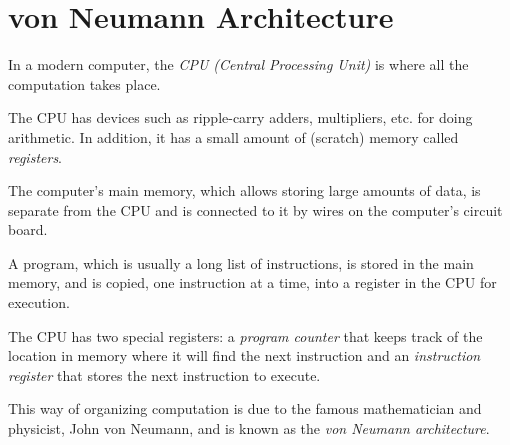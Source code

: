 \documentclass[8pt,a4paper,compress,handout]{beamer}
\begin{document}
\section{von Neumann Architecture}
\begin{frame}[fragile]
In a modern computer, the \emph{CPU (Central Processing Unit)} is where all the computation takes place.

\bigskip

The CPU has devices such as ripple-carry adders, multipliers, etc. for doing arithmetic. In addition, it has a small amount of (scratch) memory called \emph{registers}.

\bigskip

The computer's main memory, which allows storing large amounts of data, is separate from the CPU and is connected to it by wires on the computer's circuit board.

\bigskip

A program, which is usually a long list of instructions, is stored in the main memory, and is copied, one instruction at a time, into a register in the CPU for execution.

\bigskip

The CPU has two special registers: a \emph{program counter} that keeps track of the location in memory where it will find the next instruction and an \emph{instruction register} that stores the next instruction to execute. 

\bigskip

This way of organizing computation is due to the famous mathematician and physicist, John von Neumann, and is known as the \emph{von Neumann architecture}.
\end{frame}
\end{document}
